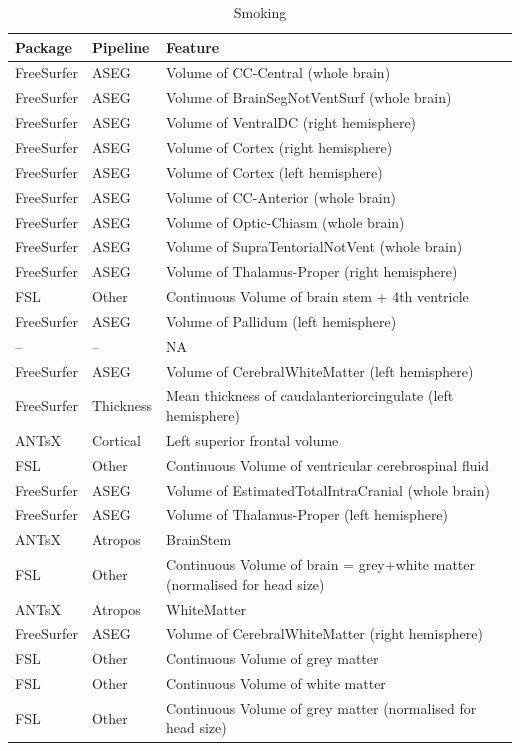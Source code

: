 \documentclass[
  10pt,
]{article}
\begin{document}
\begin{table}

\caption{\label{tab:compare-predictions}Smoking}
\centering
\begin{tabular}[t]{lll}
\toprule
Package & Pipeline & Feature\\
\midrule
FreeSurfer & ASEG & Volume of CC-Central (whole brain)\\
FreeSurfer & ASEG & Volume of BrainSegNotVentSurf (whole brain)\\
FreeSurfer & ASEG & Volume of VentralDC (right hemisphere)\\
FreeSurfer & ASEG & Volume of Cortex (right hemisphere)\\
FreeSurfer & ASEG & Volume of Cortex (left hemisphere)\\
\addlinespace
FreeSurfer & ASEG & Volume of CC-Anterior (whole brain)\\
FreeSurfer & ASEG & Volume of Optic-Chiasm (whole brain)\\
FreeSurfer & ASEG & Volume of SupraTentorialNotVent (whole brain)\\
FreeSurfer & ASEG & Volume of Thalamus-Proper (right hemisphere)\\
FSL & Other & Continuous    Volume of brain stem + 4th ventricle\\
\addlinespace
FreeSurfer & ASEG & Volume of Pallidum (left hemisphere)\\
-- & -- & NA\\
FreeSurfer & ASEG & Volume of CerebralWhiteMatter (left hemisphere)\\
FreeSurfer & Thickness & Mean thickness of caudalanteriorcingulate (left hemisphere)\\
ANTsX & Cortical & Left superior frontal volume\\
\addlinespace
FSL & Other & Continuous    Volume of ventricular cerebrospinal fluid\\
FreeSurfer & ASEG & Volume of EstimatedTotalIntraCranial (whole brain)\\
FreeSurfer & ASEG & Volume of Thalamus-Proper (left hemisphere)\\
ANTsX & Atropos & BrainStem\\
FSL & Other & Continuous    Volume of brain = grey+white matter (normalised for head size)\\
\addlinespace
ANTsX & Atropos & WhiteMatter\\
FreeSurfer & ASEG & Volume of CerebralWhiteMatter (right hemisphere)\\
FSL & Other & Continuous    Volume of grey matter\\
FSL & Other & Continuous    Volume of white matter\\
FSL & Other & Continuous    Volume of grey matter (normalised for head size)\\
\bottomrule
\end{tabular}
\end{table}
\end{document}
